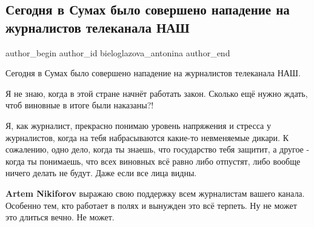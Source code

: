  
 
 
 
 
 
\subsection{Сегодня в Сумах было совершено нападение на журналистов телеканала НАШ}
\label{sec:30_10_2021.fb.bieloglazova_antonina.1.napadenie_nash}
 
\ifcmt
 author_begin
   author_id bieloglazova_antonina
 author_end
\fi

Сегодня в Сумах было совершено нападение на журналистов телеканала НАШ.

Я не знаю, когда в этой стране начнёт работать закон. Сколько ещё нужно ждать,
чтоб виновные в итоге были наказаны?!

Я, как журналист, прекрасно понимаю уровень напряжения и стресса у журналистов,
когда на тебя набрасываются какие-то невменяемые дикари. К сожалению, одно
дело, когда ты знаешь, что государство тебя защитит, а другое - когда ты
понимаешь, что всех виновных всё равно либо отпустят, либо вообще ничего делать
не будут. Даже если все лица видны.

\textbf{Artem Nikiforov} выражаю свою поддержку всем журналистам вашего канала. Особенно
тем, кто работает в полях и вынужден это всё терпеть. Ну не может это длиться
вечно. Не может.

